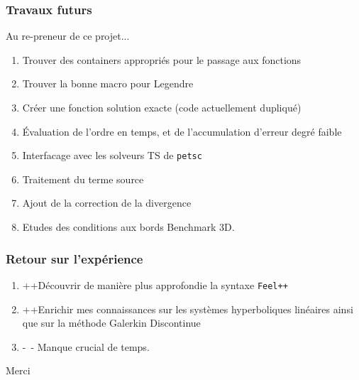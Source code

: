 \documentclass[9pt]{beamer}
\begin{document}
\begin{frame}
\frametitle{Travaux futurs}
Au re-preneur de ce projet...
\begin{enumerate}
\item Trouver des containers appropriés pour le passage aux fonctions
\item Trouver la bonne macro pour Legendre
\item Créer une fonction solution exacte (code actuellement dupliqué)
\item Évaluation de l'ordre en temps, et de l'accumulation d'erreur degré faible
\item Interfacage avec les solveurs TS de \texttt{petsc}
\item Traitement du terme source
\item Ajout de la correction de la divergence
\item Etudes des conditions aux bords Benchmark 3D.
\end{enumerate}
\end{frame}









\begin{frame}
\frametitle{Retour sur l'expérience}
\begin{enumerate}
\item ++\quad Découvrir de manière plus approfondie la syntaxe \texttt{Feel++}
\item ++\quad Enrichir mes connaissances sur les systèmes hyperboliques linéaires ainsi que sur la méthode Galerkin Discontinue
\item -\, - \quad Manque crucial de temps.
\end{enumerate}
\end{frame}












 
 
 
 
 
 
\begin{frame}
\vfill
\begin{center}
\Large Merci
\end{center}
\vfill
\end{frame}
\end{document}

